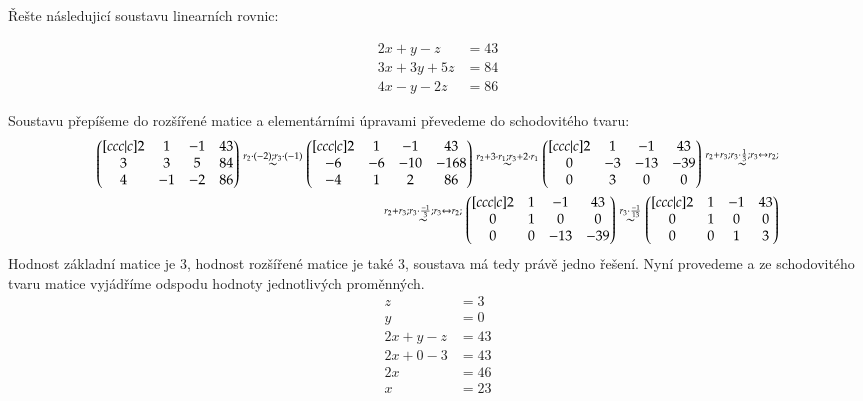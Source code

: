 \begin{example}
    Řešte následujicí soustavu linearních rovnic:

    \begin{align*}
        2x + y - z & = 43\\
        3x + 3y +5z &= 84\\
        4x - y - 2z &= 86
    \end{align*}

    Soustavu přepíšeme do rozšířené matice a elementárními úpravami
    převedeme do schodovitého tvaru:
    \begin{align*}
        \begin{pmatrix}[ccc|c]
            2 & 1 & -1 & 43\\
            3 & 3 & 5 & 84\\
            4 & -1 & -2 & 86
        \end{pmatrix} \overset{r_2  \cdot (-2); r_3 \cdot (-1)} \sim
        \begin{pmatrix}[ccc|c]
            2 & 1 & -1 & 43\\
            -6 & -6 & -10 & -168\\
            -4 & 1 & 2 & 86
        \end{pmatrix} \overset{r_2 + 3 \cdot r_1; r_3 + 2 \cdot r_1} \sim
        \begin{pmatrix}[ccc|c]
            2 & 1 & -1 & 43\\
            0 & -3 & -13 & -39\\
            0 & 3 & 0 & 0
        \end{pmatrix} \overset{r_2 + r_3; r_3 \cdot \frac{1}{3}; r_3 \leftrightarrow r_2; } \sim \\
        \overset{r_2 + r_3; r_3 \cdot \frac{-1}{3}; r_3 \leftrightarrow r_2; } \sim
        \begin{pmatrix}[ccc|c]
            2 & 1 & -1 & 43\\
            0 & 1 & 0 & 0\\
            0 & 0 & -13 & -39
        \end{pmatrix} \overset{r_3 \cdot \frac{-1}{13}} \sim
        \begin{pmatrix}[ccc|c]
            2 & 1 & -1 & 43\\
            0 & 1 & 0 & 0\\
            0 & 0 & 1 & 3
        \end{pmatrix}
    \end{align*}
    Hodnost základní matice je 3, hodnost rozšířené matice je také 3, soustava má tedy právě jedno řešení.
    Nyní provedeme  a ze schodovitého tvaru matice vyjádříme odspodu hodnoty
    jednotlivých proměnných.
    \begin{align*}
        z &= 3\\
        y &= 0\\
        2x + y -z &= 43\\
        2x +0 -3 &= 43\\
        2x &=46\\
        x &= 23
    \end{align*}
\end{example}

